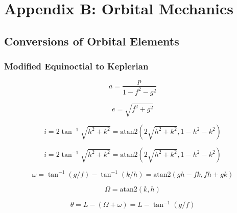 \newpage\section*{Appendix B: Orbital Mechanics}

\subsection*{Conversions of Orbital Elements}

\subsubsection*{Modified Equinoctial to Keplerian\label{mee2kep}}

\begin{equation}
    a = \frac{p}{1-f^2-g^2}
\end{equation}

\begin{equation}
    e = \sqrt{f^2 + g^2}
\end{equation}

\begin{equation}
    i = 2\tan^{-1}{\sqrt{h^2+k^2}}=\textrm{atan2}(2\sqrt{h^2+k^2},1-h^2-k^2)
\end{equation}

\begin{equation}
    i = 2\tan^{-1}{\sqrt{h^2+k^2}}=\textrm{atan2}(2\sqrt{h^2+k^2},1-h^2-k^2)
\end{equation}

\begin{equation}
    \omega=\tan^{-1}(g/f)-\tan^{-1}(k/h)=\textrm{atan2}(gh-fk, fh+gk)
\end{equation}

\begin{equation}
    \Omega=\textrm{atan2}(k, h)
\end{equation}

\begin{equation}
    \theta = L-(\Omega+\omega)=L-\tan^{-1}(g/f)
\end{equation}

